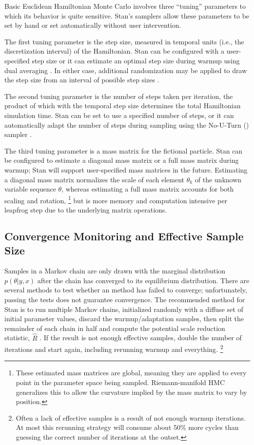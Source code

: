 Basic Euclidean Hamiltonian Monte Carlo involves three ``tuning''
parameters to which its behavior is quite sensitive.  Stan's samplers
allow these parameters to be set by hand or set automatically without
user intervention.

The first tuning parameter is the step size, measured in temporal
units (i.e., the discretization interval) of the Hamiltonian.  Stan
can be configured with a user-specified step size or it can estimate
an optimal step size during warmup using dual averaging
\citep{Nesterov:2009, Hoffman-Gelman:2011, Hoffman-Gelman:2014}.  In
either case, additional randomization may be applied to draw the step
size from an interval of possible step sizes \citep{Neal:2011}.

The second tuning parameter is the number of steps taken per
iteration, the product of which with the temporal step size determines
the total Hamiltonian simulation time.  Stan can be set to use a
specified number of steps, or it can automatically adapt the number of
steps during sampling using the No-U-Turn (\NUTS) sampler
\citep{Hoffman-Gelman:2011, Hoffman-Gelman:2014}.

The third tuning parameter is a mass matrix for the fictional
particle.  Stan can be configured to estimate a diagonal mass matrix
or a full mass matrix during warmup; Stan will support user-specified
mass matrices in the future.  Estimating a diagonal mass matrix
normalizes the scale of each element $\theta_k$ of the unknown
variable sequence $\theta$, whereas estimating a full mass matrix
accounts for both scaling and rotation,%
%
\footnote{These estimated mass matrices are global, meaning they are
  applied to every point in the parameter space being sampled.
  Riemann-manifold HMC generalizes this to allow the curvature implied
  by the mass matrix to vary by position.}
%
but is more memory and computation intensive per leapfrog step due to
the underlying matrix operations.

\subsection{Convergence Monitoring and Effective Sample Size}

Samples in a Markov chain are only drawn with the marginal
distribution $p(\theta|y,x)$ after the chain has converged to its
equilibrium distribution.  There are several methods to test whether
an \MCMC method has failed to converge; unfortunately, passing the
tests does not guarantee convergence.  The recommended method for
Stan is to run multiple Markov chains, initialized randomly with a
diffuse set of initial parameter values, discard the warmup/adaptation
samples, then split the remainder of each chain in half and compute
the potential scale reduction statistic, $\hat{R}$
\citep{GelmanRubin:1992}.  If the result is not enough effective
samples, double the number of iterations and start again, including
rerunning warmup and everything.%
%
\footnote{Often a lack of effective samples is a result of not enough
  warmup iterations.  At most this rerunning strategy will consume
  about 50\% more cycles than guessing the correct number of
  iterations at the outset.}

